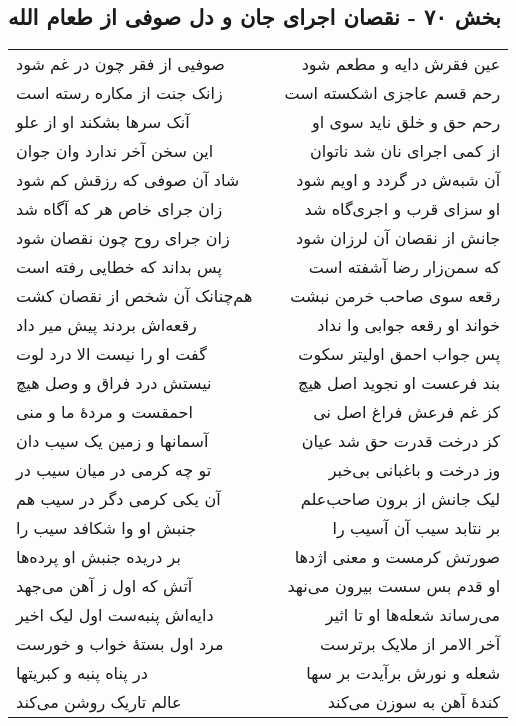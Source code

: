 \begin{center}
\section*{بخش ۷۰ - نقصان اجرای جان و دل صوفی از طعام الله}
\label{sec:sh070}
\begin{longtable}{l p{0.5cm} r}
صوفیی از فقر چون در غم شود
&&
عین فقرش دایه و مطعم شود
\\
زانک جنت از مکاره رسته است
&&
رحم قسم عاجزی اشکسته است
\\
آنک سرها بشکند او از علو
&&
رحم حق و خلق ناید سوی او
\\
این سخن آخر ندارد وان جوان
&&
از کمی اجرای نان شد ناتوان
\\
شاد آن صوفی که رزقش کم شود
&&
آن شبه‌ش در گردد و اویم شود
\\
زان جرای خاص هر که آگاه شد
&&
او سزای قرب و اجری‌گاه شد
\\
زان جرای روح چون نقصان شود
&&
جانش از نقصان آن لرزان شود
\\
پس بداند که خطایی رفته است
&&
که سمن‌زار رضا آشفته است
\\
هم‌چنانک آن شخص از نقصان کشت
&&
رقعه سوی صاحب خرمن نبشت
\\
رقعه‌اش بردند پیش میر داد
&&
خواند او رقعه جوابی وا نداد
\\
گفت او را نیست الا درد لوت
&&
پس جواب احمق اولیتر سکوت
\\
نیستش درد فراق و وصل هیچ
&&
بند فرعست او نجوید اصل هیچ
\\
احمقست و مردهٔ ما و منی
&&
کز غم فرعش فراغ اصل نی
\\
آسمانها و زمین یک سیب دان
&&
کز درخت قدرت حق شد عیان
\\
تو چه کرمی در میان سیب در
&&
وز درخت و باغبانی بی‌خبر
\\
آن یکی کرمی دگر در سیب هم
&&
لیک جانش از برون صاحب‌علم
\\
جنبش او وا شکافد سیب را
&&
بر نتابد سیب آن آسیب را
\\
بر دریده جنبش او پرده‌ها
&&
صورتش کرمست و معنی اژدها
\\
آتش که اول ز آهن می‌جهد
&&
او قدم بس سست بیرون می‌نهد
\\
دایه‌اش پنبه‌ست اول لیک اخیر
&&
می‌رساند شعله‌ها او تا اثیر
\\
مرد اول بستهٔ خواب و خورست
&&
آخر الامر از ملایک برترست
\\
در پناه پنبه و کبریتها
&&
شعله و نورش برآیدت بر سها
\\
عالم تاریک روشن می‌کند
&&
کندهٔ آهن به سوزن می‌کند

\end{longtable}
\end{center}

